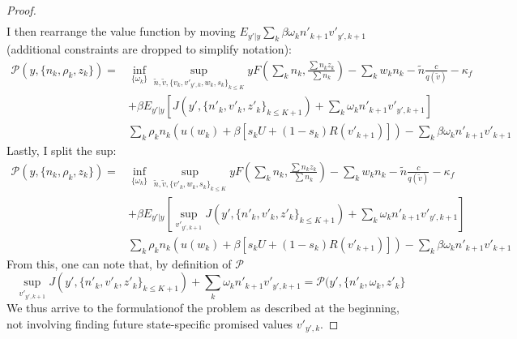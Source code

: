 \begin{proof}
\begin{equation*}
\begin{split}
    \end{split}
\end{equation*}
I then rearrange the value function by moving $E_{y'|y}\sum_k \beta\omega_kn'_{k+1}v'_{y',k+1}$ (additional constraints are dropped to simplify notation):
\begin{equation*}
    \begin{split}
 \mathcal{P}(y,\{n_k,\rho_k,z_k\}) =
    & \inf_{\{\omega_k\}}\sup_{\tilde{n},\tilde{v},\{v_k,v'_{y',k},w_{k},s_{k}\}_{k\leq K}} 
    yF(\sum_k n_k,\frac{\sum n_kz_k}{\sum n_k})-
    \sum_k w_kn_k
    -\tilde{n}\frac{c}{q(\tilde{v})}-\kappa_f \\
    & +\beta E_{y'|y} [J(y',\{n'_k,v'_k,z'_k\}_{k\leq K+1}) + \sum_k\omega_kn'_{k+1}v'_{y',k+1}]\\
    & \sum_k \rho_k n_k (u(w_k) + \beta [s_k U + (1-s_k)R(v'_{k+1})])- \sum_k \beta\omega_kn'_{k+1}v'_{k+1}  
    \end{split}
\end{equation*}
Lastly, I split the sup:
\begin{equation*}
    \begin{split}
    \mathcal{P}(y,\{n_k,\rho_k,z_k\}) =
    & \inf_{\{\omega_k\}}\sup_{\tilde{n},\tilde{v},\{v'_k,w_{k},s_{k}\}_{k\leq K}} 
    yF(\sum_k n_k,\frac{\sum n_kz_k}{\sum n_k})-
    \sum_k w_kn_k
    -\tilde{n}\frac{c}{q(\tilde{v})}-\kappa_f \\
    & +\beta E_{y'|y} [\sup_{v'_{y',k+1}}J(y',\{n'_k,v'_k,z'_k\}_{k\leq K+1}) + \sum_k\omega_kn'_{k+1}v'_{y',k+1}]\\
    & \sum_k \rho_k n_k (u(w_k) + \beta [s_k U + (1-s_k)R(v'_{k+1})])- \sum_k \beta\omega_kn'_{k+1}v'_{k+1}     
    \end{split}
\end{equation*}
From this, one can note that, by definition of $\mathcal{P}$ \[\sup_{v'_{y',k+1}}J(y',\{n'_k,v'_k,z'_k\}_{k\leq K+1}) + \sum_k\omega_kn'_{k+1}v'_{y',k+1} = \mathcal{P}(y',\{n'_k,\omega_k,z'_k\}\]
We thus arrive to the formulationof the problem as described at the beginning, not involving finding future state-specific promised values $v'_{y',k}$.
\end{proof}
